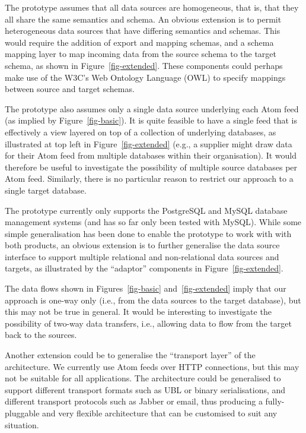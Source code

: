 \documentclass{CRPITStyle}
\begin{document}
The prototype assumes that all data sources are homogeneous, that is,
that they all share the same semantics and schema. An obvious extension
is to permit heterogeneous data sources that have differing semantics
and schemas. This would require the addition of export and mapping
schemas, and a schema mapping layer to map incoming data from the source
schema to the target schema, as shown in Figure~\ref{fig-extended}.
These components could perhaps make use of the W3C's Web Ontology
Language (OWL) \cite{McGu-DL-2004-OWL} to specify mappings between
source and target schemas.

The prototype also assumes only a single data source underlying each
Atom feed (as implied by Figure~\ref{fig-basic}). It is quite feasible
to have a single feed that is effectively a view layered on top of a
collection of underlying databases, as illustrated at top left in
Figure~\ref{fig-extended} (e.g., a supplier might draw data for their
Atom feed from multiple databases within their organisation). It would
therefore be useful to investigate the possibility of multiple source
databases per Atom feed. Similarly, there is no particular reason to
restrict our approach to a single target database.

The prototype currently only supports the PostgreSQL and MySQL database
management systems (and has so far only been tested with MySQL). While
some simple generalisation has been done to enable the prototype to work
with with both products, an obvious extension is to further generalise
the data source interface to support multiple relational and
non-relational data sources and targets, as illustrated by the
``adaptor'' components in Figure~\ref{fig-extended}.

The data flows shown in Figures~\ref{fig-basic} and~\ref{fig-extended}
imply that our approach is one-way only (i.e., from the data sources to
the target database), but this may not be true in general. It would be
interesting to investigate the possibility of two-way data transfers,
i.e., allowing data to flow from the target back to the sources.

Another extension could be to generalise the ``transport layer'' of the
architecture. We currently use Atom feeds over HTTP connections, but
this may not be suitable for all applications. The architecture could be
generalised to support different transport formats such as UBL or binary
serialisations, and different transport protocols such as Jabber or
email, thus producing a fully-pluggable and very flexible architecture
that can be customised to suit any situation.
\end{document}
